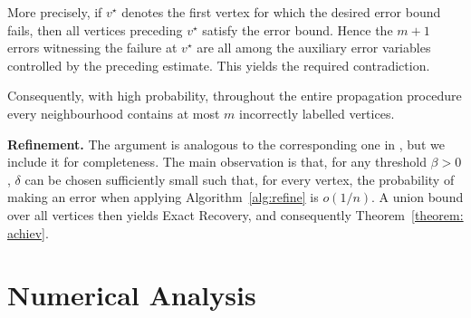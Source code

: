 \documentclass[11pt, a4paper]{amsart}
\newcommand{\1}{\mathbf{1}}
\theoremstyle{definition}
\theoremstyle{remark}
\theoremstyle{definition}
\begin{document}
More precisely, if \(v^\star\) denotes the first vertex for which the
desired error bound fails, then all vertices preceding \(v^\star\)
satisfy the error bound. Hence the \(m+1\) errors witnessing the failure
at \(v^\star\) are all among the auxiliary error variables controlled by
the preceding estimate. This yields the required contradiction.

Consequently, with high probability, throughout the entire propagation
procedure every neighbourhood contains at most \(m\) incorrectly
labelled vertices.


\textbf{Refinement.} The argument is analogous to the corresponding one in \cite{gaudio2026jan}, but we include it for completeness. The main observation is that, for any threshold $\beta>0$, $\delta$ can be chosen sufficiently small such that, for every vertex, the probability of making an error when applying Algorithm~\ref{alg:refine} is $o(1/n)$. A union bound over all vertices then yields Exact Recovery, and consequently Theorem~\ref{theorem: achiev}.

\section{Numerical Analysis}
\end{document}
